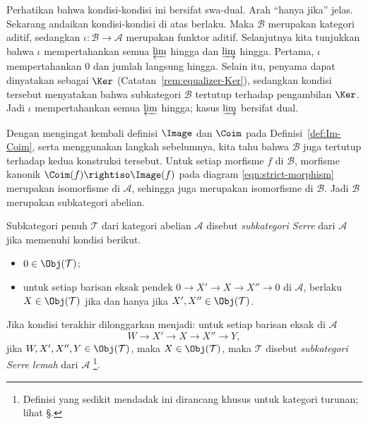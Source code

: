 \begin{bukti}
Perhatikan bahwa kondisi-kondisi ini bersifat swa-dual. Arah “hanya jika” jelas.
Sekarang andaikan kondisi-kondisi di atas berlaku. Maka $\mathcal{B}$ merupakan
kategori aditif, sedangkan $\iota:\mathcal{B}\to\mathcal{A}$ merupakan funktor
aditif. Selanjutnya kita tunjukkan bahwa $\iota$ mempertahankan semua
$\varprojlim$ hingga dan $\varinjlim$ hingga. Pertama, $\iota$ mempertahankan
$0$ dan jumlah langsung hingga. Selain itu, penyama dapat dinyatakan sebagai
$\Ker$ (Catatan~\ref{rem:equalizer-Ker}), sedangkan kondisi tersebut
menyatakan bahwa subkategori $\mathcal{B}$ tertutup terhadap pengambilan $\Ker$.
Jadi $\iota$ mempertahankan semua $\varprojlim$ hingga; kasus $\varinjlim$
bersifat dual.

Dengan mengingat kembali definisi $\Image$ dan $\Coim$ pada
Definisi~\ref{def:Im-Coim}, serta menggunakan langkah sebelumnya, kita tahu bahwa
$\mathcal{B}$ juga tertutup terhadap kedua konstruksi tersebut. Untuk setiap
morfisme $f$ di $\mathcal{B}$, morfisme kanonik
$\Coim(f)\rightiso\Image(f)$ pada diagram \eqref{eqn:strict-morphism} merupakan
isomorfisme di $\mathcal{A}$, sehingga juga merupakan isomorfisme di
$\mathcal{B}$. Jadi $\mathcal{B}$ merupakan subkategori abelian.
\end{bukti}

\begin{definisi}[J.-P.\ Serre]\label{def:Serre-subcat}
Subkategori penuh $\mathcal{T}$ dari kategori abelian $\mathcal{A}$ disebut
\emph{subkategori Serre} dari $\mathcal{A}$ jika memenuhi kondisi berikut.
\begin{itemize}
	\item $0\in\Obj(\mathcal{T})$;
	\item untuk setiap barisan eksak pendek
	$0\to X'\to X\to X''\to0$ di $\mathcal{A}$, berlaku
	$X\in\Obj(\mathcal{T})$ jika dan hanya jika
	$X',X''\in\Obj(\mathcal{T})$.
\end{itemize}
Jika kondisi terakhir dilonggarkan menjadi: untuk setiap barisan eksak
di $\mathcal{A}$
\[W\to X'\to X\to X''\to Y,\]
jika $W,X',X'',Y\in\Obj(\mathcal{T})$, maka $X\in\Obj(\mathcal{T})$,
maka $\mathcal{T}$ disebut \emph{subkategori Serre lemah} dari $\mathcal{A}$
\footnote{Definisi yang sedikit mendadak ini dirancang khusus untuk kategori
turunan; lihat \S{}.}.
\end{definisi}

